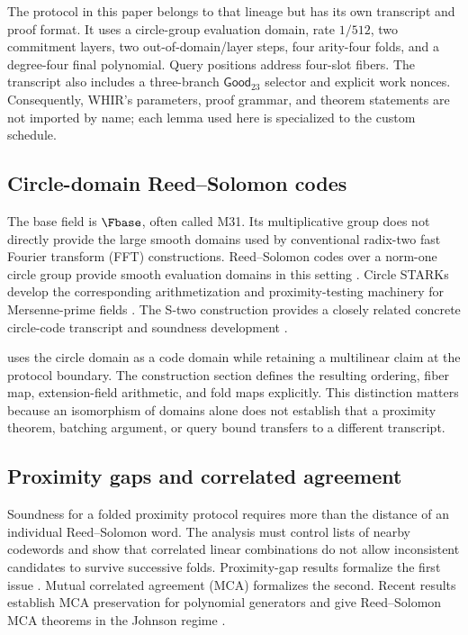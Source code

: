 The protocol in this paper belongs to that lineage but has its own transcript
and proof format.  It uses a circle-group evaluation domain, rate $1/512$, two
commitment layers, two out-of-domain/layer steps, four arity-four folds, and a
degree-four final polynomial.  Query positions address four-slot fibers.  The
transcript also includes a three-branch \(\mathsf{Good}_{23}\) selector and explicit
work nonces.  Consequently, WHIR's parameters, proof grammar, and theorem
statements are not imported by name; each lemma used here is specialized to
the custom schedule.

\subsection{Circle-domain Reed--Solomon codes}

The base field is $\Fbase$, often called M31.  Its multiplicative group does
not directly provide the large smooth domains used by conventional radix-two
fast Fourier transform (FFT) constructions.  Reed--Solomon codes over a
norm-one circle group provide
smooth evaluation domains in this setting
\cite{HaboeckLubarovNabaglo2023}.
Circle STARKs develop the corresponding arithmetization and proximity-testing
machinery for Mersenne-prime fields
\cite{HaboeckLevitPapini2024}.  The S-two
construction provides a closely related concrete circle-code transcript and
soundness development \cite{CarmonEtAl2026Stwo}.

\Profile{} uses the circle domain as a code domain while retaining a
multilinear claim at the protocol boundary.  The construction section defines
the resulting ordering, fiber map, extension-field arithmetic, and fold maps
explicitly.  This distinction matters because an isomorphism of domains alone
does not establish that a proximity theorem, batching argument, or query
bound transfers to a different transcript.

\subsection{Proximity gaps and correlated agreement}

Soundness for a folded proximity protocol requires more than the distance of
an individual Reed--Solomon word.  The analysis must control lists of nearby
codewords and show that correlated linear combinations do not allow
inconsistent candidates to survive successive folds.  Proximity-gap results
formalize the first issue
\cite{BenSassonCarmonIshaiKoppartySaraf2023}.  Mutual correlated
agreement (MCA) formalizes the second.  Recent results establish MCA
preservation for polynomial generators and give Reed--Solomon MCA theorems in
the Johnson regime
\cite{BordageChiesaGuanManzur2025,Haboeck2025MCA}.

